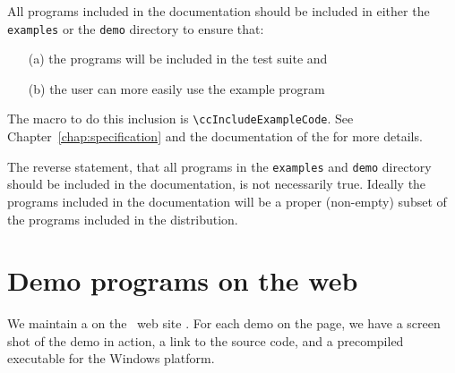 All programs included in the documentation should be included in either
the \texttt{examples} or the \texttt{demo} directory to ensure that:
\begin{itemize}
   \item[(a)] the programs will be included in the test suite and
   \item[(b)] the user can more easily use the example program
\end{itemize}
The macro to do this inclusion is \verb|\ccIncludeExampleCode|.
See Chapter~\ref{chap:specification} and the documentation of the
 for more 
details.

The reverse statement, that all programs in the \texttt{examples}
and \texttt{demo} directory should be included in the documentation,
is not necessarily true.  Ideally the programs included in the documentation
will be a proper (non-empty) subset of the programs included in the 
distribution.

\section{Demo programs on the web}
\label{sec:demos_web_page}

We maintain a  on the \cgal\ web site
.  For each demo on
the page, we have a screen shot of the demo in action, a link to the source
code, and a precompiled executable for the Windows platform.

